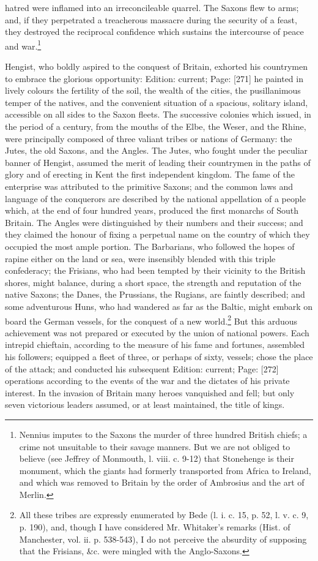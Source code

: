 hatred were inflamed into an irreconcileable quarrel. The Saxons flew to arms; and, if they perpetrated a treacherous massacre during the security of a feast, they destroyed the reciprocal confidence which sustains the intercourse of peace and war.\footnote{Nennius imputes to the Saxons the murder of three hundred British chiefs; a crime not unsuitable to their savage manners. But we are not obliged to believe (see Jeffrey of Monmouth, l. viii. c. 9-12) that Stonehenge is their monument, which the giants had formerly transported from Africa to Ireland, and which was removed to Britain by the order of Ambrosius and the art of Merlin.}

Hengist, who boldly aspired to the conquest of Britain, exhorted his countrymen to embrace the glorious opportunity: Edition: current; Page: [271] he painted in lively colours the fertility of the soil, the wealth of the cities, the pusillanimous temper of the natives, and the convenient situation of a spacious, solitary island, accessible on all sides to the Saxon fleets. The successive colonies which issued, in the period of a century, from the mouths of the Elbe, the Weser, and the Rhine, were principally composed of three valiant tribes or nations of Germany: the Jutes, the old Saxons, and the Angles. The Jutes, who fought under the peculiar banner of Hengist, assumed the merit of leading their countrymen in the paths of glory and of erecting in Kent the first independent kingdom. The fame of the enterprise was attributed to the primitive Saxons; and the common laws and language of the conquerors are described by the national appellation of a people which, at the end of four hundred years, produced the first monarchs of South Britain. The Angles were distinguished by their numbers and their success; and they claimed the honour of fixing a perpetual name on the country of which they occupied the most ample portion. The Barbarians, who followed the hopes of rapine either on the land or sea, were insensibly blended with this triple confederacy; the Frisians, who had been tempted by their vicinity to the British shores, might balance, during a short space, the strength and reputation of the native Saxons; the Danes, the Prussians, the Rugians, are faintly described; and some adventurous Huns, who had wandered as far as the Baltic, might embark on board the German vessels, for the conquest of a new world.\footnote{All these tribes are expressly enumerated by Bede (l. i. c. 15, p. 52, l. v. c. 9, p. 190), and, though I have considered Mr. Whitaker\texthebrew{}’s remarks (Hist. of Manchester, vol. ii. p. 538-543), I do not perceive the absurdity of supposing that the Frisians, \&c. were mingled with the Anglo-Saxons.} But this arduous achievement was not prepared or executed by the union of national powers. Each intrepid chieftain, according to the measure of his fame and fortunes, assembled his followers; equipped a fleet of three, or perhaps of sixty, vessels; chose the place of the attack; and conducted his subsequent Edition: current; Page: [272] operations according to the events of the war and the dictates of his private interest. In the invasion of Britain many heroes vanquished and fell; but only seven victorious leaders assumed, or at least maintained, the title of kings. 